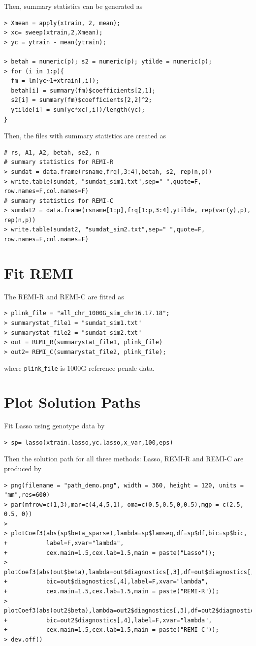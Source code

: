 \documentclass[11pt]{article}
\begin{document}
Then, summary statistics can be generated as
\begin{verbatim}
> Xmean = apply(xtrain, 2, mean);
> xc= sweep(xtrain,2,Xmean);
> yc = ytrain - mean(ytrain);

> betah = numeric(p); s2 = numeric(p); ytilde = numeric(p);
> for (i in 1:p){
  fm = lm(yc~1+xtrain[,i]);
  betah[i] = summary(fm)$coefficients[2,1];
  s2[i] = summary(fm)$coefficients[2,2]^2;
  ytilde[i] = sum(yc*xc[,i])/length(yc);
}
\end{verbatim}

Then, the files with summary statistics are created as

\begin{verbatim}
# rs, A1, A2, betah, se2, n
# summary statistics for REMI-R
> sumdat = data.frame(rsname,frq[,3:4],betah, s2, rep(n,p))
> write.table(sumdat, "sumdat_sim1.txt",sep=" ",quote=F, row.names=F,col.names=F)
# summary statistics for REMI-C
> sumdat2 = data.frame(rsname[1:p],frq[1:p,3:4],ytilde, rep(var(y),p), rep(n,p))
> write.table(sumdat2, "sumdat_sim2.txt",sep=" ",quote=F, row.names=F,col.names=F)
\end{verbatim}

\section{Fit REMI}
\label{REMIfit}
The REMI-R and REMI-C are fitted as
\begin{verbatim}
> plink_file = "all_chr_1000G_sim_chr16.17.18";
> summarystat_file1 = "sumdat_sim1.txt"
> summarystat_file2 = "sumdat_sim2.txt"
> out = REMI_R(summarystat_file1, plink_file)
> out2= REMI_C(summarystat_file2, plink_file);
\end{verbatim}
where \texttt{plink$\_$file} is 1000G reference penale data.

\section{Plot Solution Paths}
Fit Lasso using genotype data by
\begin{verbatim}
> sp= lasso(xtrain.lasso,yc.lasso,x_var,100,eps)
\end{verbatim}
Then the solution path for all three methods: Lasso, REMI-R and REMI-C are produced by
\begin{verbatim}
> png(filename = "path_demo.png", width = 360, height = 120, units = "mm",res=600)
> par(mfrow=c(1,3),mar=c(4,4,5,1), oma=c(0.5,0.5,0,0.5),mgp = c(2.5, 0.5, 0))
>
> plotCoef3(abs(sp$beta_sparse),lambda=sp$lamseq,df=sp$df,bic=sp$bic,
+           label=F,xvar="lambda",
+           cex.main=1.5,cex.lab=1.5,main = paste("Lasso"));
> plotCoef3(abs(out$beta),lambda=out$diagnostics[,3],df=out$diagnostics[,1],
+           bic=out$diagnostics[,4],label=F,xvar="lambda",
+           cex.main=1.5,cex.lab=1.5,main = paste("REMI-R"));
> plotCoef3(abs(out2$beta),lambda=out2$diagnostics[,3],df=out2$diagnostics[,1],
+           bic=out2$diagnostics[,4],label=F,xvar="lambda",
+           cex.main=1.5,cex.lab=1.5,main = paste("REMI-C"));
> dev.off()
\end{verbatim}
\end{document}
